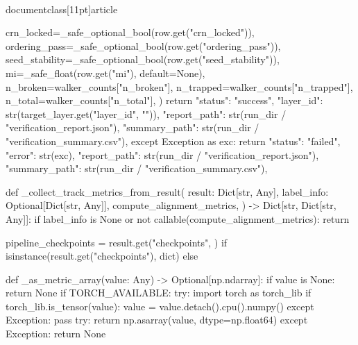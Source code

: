 \\documentclass[11pt]{article}
\begin{document}
\begin{CodeBlock}
                    crn_locked=_safe_optional_bool(row.get("crn_locked")),
                    ordering_pass=_safe_optional_bool(row.get("ordering_pass")),
                    seed_stability=_safe_optional_bool(row.get("seed_stability")),
                    mi=_safe_float(row.get("mi"), default=None),
                    n_broken=walker_counts["n_broken"],
                    n_trapped=walker_counts["n_trapped"],
                    n_total=walker_counts["n_total"],
                )
        return {
            "status": "success",
            "layer_id": str(target_layer.get("layer_id", "")),
            "report_path": str(run_dir / "verification_report.json"),
            "summary_path": str(run_dir / "verification_summary.csv"),
        }
    except Exception as exc:
        return {
            "status": "failed",
            "error": str(exc),
            "report_path": str(run_dir / "verification_report.json"),
            "summary_path": str(run_dir / "verification_summary.csv"),
        }


def _collect_track_metrics_from_result(
    result: Dict[str, Any],
    label_info: Optional[Dict[str, Any]],
    compute_alignment_metrics,
) -> Dict[str, Dict[str, Any]]:
    if label_info is None or not callable(compute_alignment_metrics):
        return {}

    pipeline_checkpoints = result.get("checkpoints", {}) if isinstance(result.get("checkpoints"), dict) else {}

    def _as_metric_array(value: Any) -> Optional[np.ndarray]:
        if value is None:
            return None
        if TORCH_AVAILABLE:
            try:
                import torch as torch_lib
                if torch_lib.is_tensor(value):
                    value = value.detach().cpu().numpy()
            except Exception:
                pass
        try:
            return np.asarray(value, dtype=np.float64)
        except Exception:
            return None


\end{CodeBlock}
\end{document}
